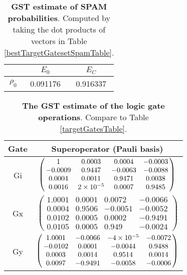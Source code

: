 {\begin{table}[h]
\begin{center}
\begin{tabular}[l]{|c|c|c|}
\hline
 & $E_{0}$ & $E_C$ \\ \hline
$\rho_{0}$ & 0.091176 & 0.916337 \\ \hline
\end{tabular}

\caption{\textbf{GST estimate of SPAM probabilities}.  Computed by taking the dot products of vectors in Table \ref{bestTargetGatesetSpamTable}.\label{bestTargetGatesetSpamParametersTable}}
\end{center}
\end{table}

\begin{table}[h]
\begin{center}
\begin{tabular}[l]{|c|c|}
\hline
Gate & Superoperator (Pauli basis) \\ \hline
Gi & $ \left(\!\!\begin{array}{cccc}
1 & 0.0003 & 0.0004 & -0.0003 \\ 
-0.0009 & 0.9447 & -0.0063 & -0.0088 \\ 
0.0004 & 0.0011 & 0.9471 & 0.0038 \\ 
0.0016 & 2\times 10^{-5} & 0.0007 & 0.9485
 \end{array}\!\!\right) $
 \\ \hline
Gx & $ \left(\!\!\begin{array}{cccc}
1.0001 & 0.0001 & 0.0072 & -0.0066 \\ 
0.0004 & 0.9506 & -0.0051 & -0.0052 \\ 
0.0102 & 0.0005 & 0.0002 & -0.9491 \\ 
0.0105 & 0.0005 & 0.949 & -0.0024
 \end{array}\!\!\right) $
 \\ \hline
Gy & $ \left(\!\!\begin{array}{cccc}
1.0001 & -0.0066 & -4\times 10^{-5} & -0.0072 \\ 
-0.0102 & 0.0001 & -0.0044 & 0.9488 \\ 
0.0003 & 0.0014 & 0.9514 & 0.0014 \\ 
0.0097 & -0.9491 & -0.0058 & -0.0006
 \end{array}\!\!\right) $
 \\ \hline
\end{tabular}

\caption{\textbf{The GST estimate of the logic gate operations}.  Compare to Table \ref{targetGatesTable}.\label{bestTargetGatesetGatesTable}}
\end{center}
\end{table}

}
